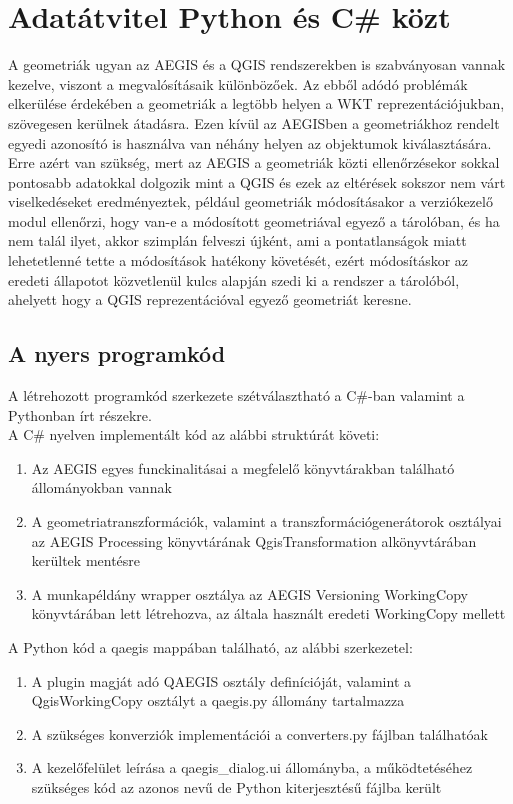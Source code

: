 \section{Adatátvitel Python és C\# közt}
A geometriák ugyan az AEGIS és a QGIS rendszerekben is szabványosan vannak kezelve, viszont a megvalósításaik különbözőek. Az ebből adódó problémák elkerülése érdekében a geometriák a legtöbb helyen a WKT reprezentációjukban, szövegesen kerülnek átadásra. Ezen kívül az AEGISben a geometriákhoz rendelt egyedi azonosító is használva van néhány helyen az objektumok kiválasztására. Erre azért van szükség, mert az AEGIS a geometriák közti ellenőrzésekor sokkal pontosabb adatokkal dolgozik mint a QGIS és ezek az eltérések sokszor nem várt viselkedéseket eredményeztek, például geometriák módosításakor a verziókezelő modul ellenőrzi, hogy van-e a módosított geometriával egyező a tárolóban, és ha nem talál ilyet, akkor szimplán felveszi újként, ami a pontatlanságok miatt lehetetlenné tette a módosítások hatékony követését, ezért módosításkor az eredeti állapotot közvetlenül kulcs alapján szedi ki a rendszer a tárolóból, ahelyett hogy a QGIS reprezentációval egyező geometriát keresne.


\subsection{A nyers programkód}
A létrehozott programkód szerkezete szétválasztható a C\#-ban valamint a Pythonban írt részekre.\\
A C\# nyelven implementált kód az alábbi struktúrát követi:
\begin{enumerate}
	\item Az AEGIS egyes funckinalitásai a megfelelő könyvtárakban található állományokban vannak
	\item A geometriatranszformációk, valamint a transzformációgenerátorok osztályai az AEGIS Processing könyvtárának QgisTransformation alkönyvtárában kerültek mentésre
	\item A munkapéldány wrapper osztálya az AEGIS Versioning WorkingCopy könyvtárában lett létrehozva, az általa használt eredeti WorkingCopy mellett 
\end{enumerate}
A Python kód a qaegis mappában található, az alábbi szerkezetel:
\begin{enumerate}
	\item A plugin magját adó QAEGIS osztály definícióját, valamint a QgisWorkingCopy osztályt a qaegis.py állomány tartalmazza
	\item A szükséges konverziók implementációi a converters.py fájlban találhatóak
	\item A kezelőfelület leírása a qaegis\_dialog.ui állományba, a működtetéséhez szükséges kód az azonos nevű de Python kiterjesztésű fájlba került
\end{enumerate}
